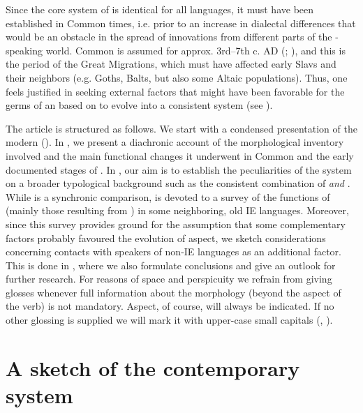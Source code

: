 \documentclass[output=paper]{langsci/langscibook}
\begin{document}
Since the core system of  is identical for all  languages, it must have been established in Common  times, i.e. prior to an increase in dialectal differences that would be an obstacle in the spread of innovations from different parts of the -speaking world. Common  is assumed for approx. 3rd–7th c. AD (\citealt{Andersen1985}; \citealt[1126f.]{Holzer2014}), and this is the period of the Great Migrations, which must have affected early Slavs and their neighbors (e.g. Goths, Balts, but also some Altaic populations). Thus, one feels justified in seeking external factors that might have been favorable for the germs of an  based on  to evolve into a consistent system (see ).

The article is structured as follows. We start with a condensed presentation of the modern   (). In , we present a diachronic account of the morphological inventory involved and the main functional changes it underwent in Common  and the early documented stages of . In , our aim is to establish the peculiarities of the  system on a broader typological background such as the consistent combination of  \textit{and} . While  is a synchronic comparison,  is devoted to a survey of the functions of  (mainly those resulting from ) in some neighboring, old IE languages. Moreover, since this survey provides ground for the assumption that some complementary factors probably favoured the evolution of  aspect, we sketch considerations concerning contacts with speakers of non-IE languages as an additional factor. This is done in , where we also formulate conclusions and give an outlook for further research.
For reasons of space and perspicuity we refrain from giving glosses whenever full information about the morphology (beyond the aspect of the verb) is not mandatory. Aspect, of course, will always be indicated. If no other glossing is supplied we will mark it with upper-case small capitals ({\PFV}, {\IPFV}).

\section{A sketch of the contemporary system}\label{sec:wiemerserzant:2}
\end{document}
